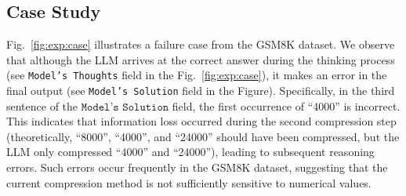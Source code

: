 \subsection{Case Study}

Fig.~\ref{fig:exp:case} illustrates a failure case from the GSM8K dataset. 
We observe that although the LLM arrives at the correct answer during the thinking process (see \texttt{Model's Thoughts} field in the Fig.~\ref{fig:exp:case}), it makes an error in the final output (see \texttt{Model's Solution} field in the Figure). 
Specifically, in the third sentence of the $\texttt{Model's Solution}$ field, the first occurrence of ``4000'' is incorrect. 
This indicates that information loss occurred during the second compression step (theoretically, ``8000'', ``4000'', and ``24000'' should have been compressed, but the LLM only compressed ``4000'' and ``24000''), leading to subsequent reasoning errors. 
Such errors occur frequently in the GSM8K dataset, suggesting that the current compression method is not sufficiently sensitive to numerical values. 




